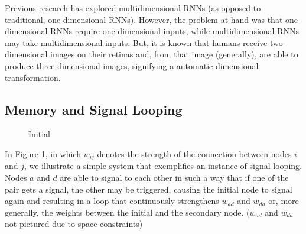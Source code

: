 \documentclass[12pt]{article}
\begin{document}
Previous research has explored multidimensional RNNs \cite{dimensionalrnn} (as opposed to traditional, one-dimensional RNNs).  However, the problem at hand was that one-dimensional RNNs require one-dimensional inputs, while multidimensional RNNs may take multidimensional inputs.  But, it is known that humans receive two-dimensional images on their retinas and, from that image (generally), are able to produce three-dimensional images, signifying a automatic dimensional transformation.

\subsection{Memory and Signal Looping} \label{looping}

\begin{figure}[H]
    \centering
    \caption{Initial} \label{fig:Initial}
\end{figure}

In Figure 1, in which $w_{ij}$ denotes the strength of the connection between nodes $i$ and $j$, we illustrate a simple system that exemplifies an instance of signal looping.  Nodes $a$ and $d$ are able to signal to each other in such a way that if one of the pair gets a signal, the other may be triggered, causing the initial node to signal again and resulting in a loop that continuously strengthens $w_{ad}$ and $w_{da}$ or, more generally, the weights between the initial and the secondary node. ($w_{ad}$ and $w_{da}$ not pictured due to space constraints)
\end{document}
